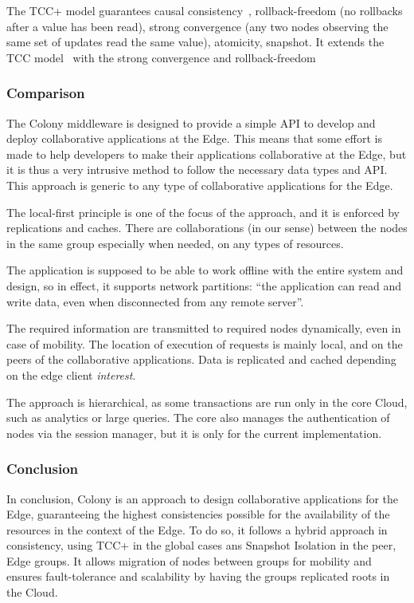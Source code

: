 The TCC+ model guarantees causal consistency~\cite{ANBKH95},
rollback-freedom (no rollbacks after a value has been read), strong
convergence (any two nodes observing the same set of updates read the
same value), atomicity, snapshot.
%
It extends the TCC model~\cite{ZPDBVS15} with the strong convergence
and rollback-freedom


\subsubsection*{Comparison}

The Colony middleware is designed to provide a simple \acrshort{API}
to develop and deploy collaborative applications at the Edge.
%
This means that some effort is made to help developers to make their
applications collaborative at the Edge, but it is thus a very
intrusive method to follow the necessary data types and \acrshort{API}.
%
%
This approach is generic to any type of collaborative applications for
the Edge.

The local-first principle is one of the focus of the approach, and it
is enforced by replications and caches.
%
There are collaborations (in our sense) between the nodes in the same
group especially when needed, on any types of resources.

The application is supposed to be able to work offline with the entire
system and design, so in effect, it supports network partitions: ``the
application can read and write data, even when disconnected from any
remote server''.

The required information are transmitted to required nodes
dynamically, even in case of mobility.
%
The location of execution of requests is mainly local, and on the
peers of the collaborative applications.
%
Data is replicated and cached depending on the edge client
\emph{interest}.

The approach is hierarchical, as some transactions are run only in
the core Cloud, such as analytics or large queries.
%
The core also manages the authentication of nodes via the session
manager, but it is only for the current implementation.


\subsubsection*{Conclusion}

In conclusion, Colony is an approach to design collaborative
applications for the Edge, guaranteeing the highest consistencies
possible for the availability of the resources in the context of the
Edge.
%
To do so, it follows a hybrid approach in consistency, using TCC+ in
the global cases ans Snapshot Isolation in the peer, Edge groups.
%
It allows migration of nodes between groups for mobility and ensures
fault-tolerance and scalability by having the groups replicated
roots in the Cloud.
%

